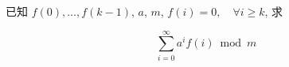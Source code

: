 已知 \(f(0),\dots,f(k-1)\), \(a\), \(m\), \(f(i)=0,\quad \forall i\geq k\), 求

\[
    \sum_{i=0}^{\infty} a^i f(i)\bmod{m}
\]
